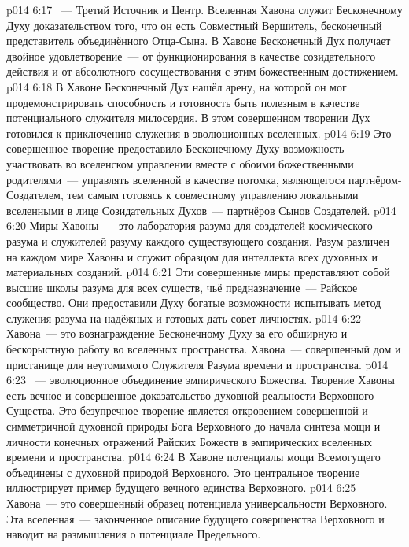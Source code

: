 \vs p014 6:17 ~--- Третий Источник и Центр. Вселенная Хавона служит Бесконечному Духу доказательством того, что он есть Совместный Вершитель, бесконечный представитель объединённого Отца\hyp{}Сына. В Хавоне Бесконечный Дух получает двойное удовлетворение~--- от функционирования в качестве созидательного действия и от абсолютного сосуществования с этим божественным достижением.
\vs p014 6:18 В Хавоне Бесконечный Дух нашёл арену, на которой он мог продемонстрировать способность и готовность быть полезным в качестве потенциального служителя милосердия. В этом совершенном творении Дух готовился к приключению служения в эволюционных вселенных.
\vs p014 6:19 Это совершенное творение предоставило Бесконечному Духу возможность участвовать во вселенском управлении вместе с обоими божественными родителями~--- управлять вселенной в качестве потомка, являющегося партнёром\hyp{}Создателем, тем самым готовясь к совместному управлению локальными вселенными в лице Созидательных Духов~--- партнёров Сынов Создателей.
\vs p014 6:20 Миры Хавоны~--- это лаборатория разума для создателей космического разума и служителей разуму каждого существующего создания. Разум различен на каждом мире Хавоны и служит образцом для интеллекта всех духовных и материальных созданий.
\vs p014 6:21 Эти совершенные миры представляют собой высшие школы разума для всех существ, чьё предназначение~--- Райское сообщество. Они предоставили Духу богатые возможности испытывать метод служения разума на надёжных и готовых дать совет личностях.
\vs p014 6:22 Хавона~--- это вознаграждение Бесконечному Духу за его обширную и бескорыстную работу во вселенных пространства. Хавона~--- совершенный дом и пристанище для неутомимого Служителя Разума времени и пространства.
\vs p014 6:23 ~--- эволюционное объединение эмпирического Божества. Творение Хавоны есть вечное и совершенное доказательство духовной реальности Верховного Существа. Это безупречное творение является откровением совершенной и симметричной духовной природы Бога Верховного до начала синтеза мощи и личности конечных отражений Райских Божеств в эмпирических вселенных времени и пространства.
\vs p014 6:24 В Хавоне потенциалы мощи Всемогущего объединены с духовной природой Верховного. Это центральное творение иллюстрирует пример будущего вечного единства Верховного.
\vs p014 6:25 Хавона~--- это совершенный образец потенциала универсальности Верховного. Эта вселенная~--- законченное описание будущего совершенства Верховного и наводит на размышления о потенциале Предельного.
